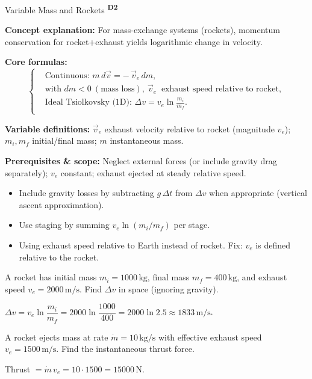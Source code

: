 ﻿\documentclass[12pt,a4paper]{article}
\providecommand{\KPFormulas}{}
\providecommand{\KPHeuristics}{}
\providecommand{\KPProblems}{}
\newcommand{\DTwo}{\texorpdfstring{\textsuperscript{\textbf{D2}}}{ D2}}
\begin{document}
\begin{KnowledgePoint}{Variable Mass and Rockets \DTwo}
  \KPFormulas
\begin{formulabox}
  \textbf{Concept explanation:} For mass-exchange systems (rockets), momentum conservation for rocket+exhaust yields logarithmic change in velocity.
  
  \textbf{Core formulas:}
  \[
  \left\{\begin{aligned}
    &\text{Continuous: } m\,d\vec v=-\,\vec v_e\,dm,\\
    &\text{with } dm<0\ (\text{mass loss}),\ \vec v_e\ \text{ exhaust speed relative to rocket},\\
    &\text{Ideal Tsiolkovsky (1D): } \Delta v=v_e\ln\frac{m_i}{m_f}.\\
  \end{aligned}\right.
  \]
  
  \textbf{Variable definitions:} $\vec v_e$ exhaust velocity relative to rocket (magnitude $v_e$); $m_i,m_f$ initial/final mass; $m$ instantaneous mass.
  
  
  
  \textbf{Prerequisites \& scope:} Neglect external forces (or include gravity drag separately); $v_e$ constant; exhaust ejected at steady relative speed.
\end{formulabox}

  \KPHeuristics
  \begin{heuristicsbox}
  \begin{itemize}[leftmargin=*]
    \item Include gravity losses by subtracting $g\,\Delta t$ from $\Delta v$ when appropriate (vertical ascent approximation).
    \item Use staging by summing $v_e\ln(m_i/m_f)$ per stage.
  \end{itemize}
  \vspace{0.4em}
  \begin{itemize}[leftmargin=*]
    \item Using exhaust speed relative to Earth instead of rocket. Fix: $v_e$ is defined relative to the rocket.
  \end{itemize}
  \end{heuristicsbox}

  \KPProblems
\begin{cheatproblem}
  A rocket has initial mass $m_i=1000\,\text{kg}$, final mass $m_f=400\,\text{kg}$, and exhaust speed $v_e=2000\,\text{m/s}$. Find $\Delta v$ in space (ignoring gravity).
\begin{solutionbox}
  $\Delta v=v_e\ln\dfrac{m_i}{m_f}=2000\ln\dfrac{1000}{400}=2000\ln2.5\approx1833\,\text{m/s}$.
\end{solutionbox}
\end{cheatproblem}
\begin{cheatproblem}
  A rocket ejects mass at rate $\dot m=10\,\text{kg/s}$ with effective exhaust speed $v_e=1500\,\text{m/s}$. Find the instantaneous thrust force.
\begin{solutionbox}
  Thrust $=\dot m\,v_e=10\cdot1500=15000\,\text{N}$.
\end{solutionbox}
\end{cheatproblem}
\end{KnowledgePoint}
\end{document}
